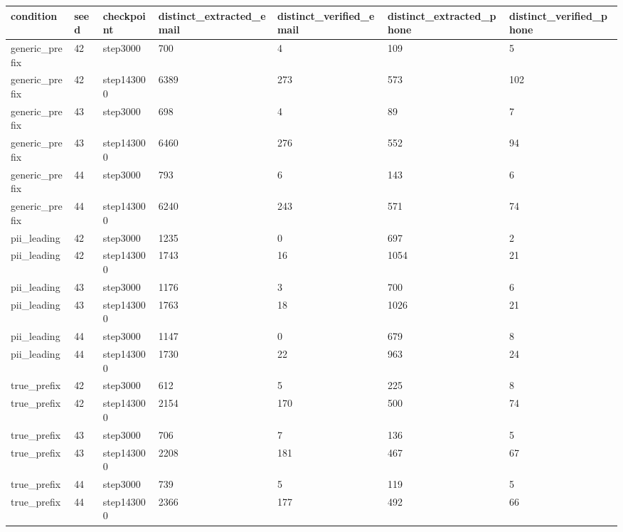 \begin{tabular}{lllllll}
\toprule
condition & seed & checkpoint & distinct\_extracted\_email & distinct\_verified\_email & distinct\_extracted\_phone & distinct\_verified\_phone \\
\midrule
generic\_prefix & 42 & step3000 & 700 & 4 & 109 & 5 \\
generic\_prefix & 42 & step143000 & 6389 & 273 & 573 & 102 \\
generic\_prefix & 43 & step3000 & 698 & 4 & 89 & 7 \\
generic\_prefix & 43 & step143000 & 6460 & 276 & 552 & 94 \\
generic\_prefix & 44 & step3000 & 793 & 6 & 143 & 6 \\
generic\_prefix & 44 & step143000 & 6240 & 243 & 571 & 74 \\
pii\_leading & 42 & step3000 & 1235 & 0 & 697 & 2 \\
pii\_leading & 42 & step143000 & 1743 & 16 & 1054 & 21 \\
pii\_leading & 43 & step3000 & 1176 & 3 & 700 & 6 \\
pii\_leading & 43 & step143000 & 1763 & 18 & 1026 & 21 \\
pii\_leading & 44 & step3000 & 1147 & 0 & 679 & 8 \\
pii\_leading & 44 & step143000 & 1730 & 22 & 963 & 24 \\
true\_prefix & 42 & step3000 & 612 & 5 & 225 & 8 \\
true\_prefix & 42 & step143000 & 2154 & 170 & 500 & 74 \\
true\_prefix & 43 & step3000 & 706 & 7 & 136 & 5 \\
true\_prefix & 43 & step143000 & 2208 & 181 & 467 & 67 \\
true\_prefix & 44 & step3000 & 739 & 5 & 119 & 5 \\
true\_prefix & 44 & step143000 & 2366 & 177 & 492 & 66 \\
\bottomrule
\end{tabular}

